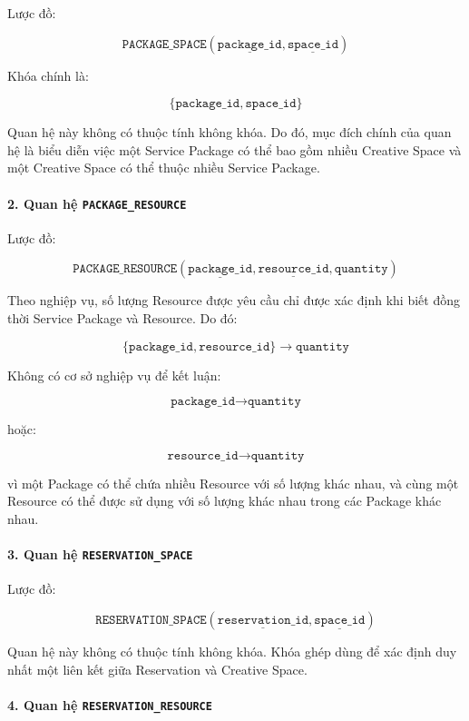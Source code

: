 Lược đồ:

$$
\texttt{PACKAGE\_SPACE}(
\underline{\texttt{package\_id}},
\underline{\texttt{space\_id}})
$$

Khóa chính là:

$$
\{
\texttt{package\_id},
\texttt{space\_id}
\}
$$

Quan hệ này không có thuộc tính không khóa. Do đó, mục đích chính của quan hệ là biểu diễn việc một Service Package có thể bao gồm nhiều Creative Space và một Creative Space có thể thuộc nhiều Service Package.

\paragraph{2. Quan hệ \texttt{PACKAGE\_RESOURCE}}\mbox{}\par

Lược đồ:

$$
\texttt{PACKAGE\_RESOURCE}(
\underline{\texttt{package\_id}},
\underline{\texttt{resource\_id}},
\texttt{quantity})
$$

Theo nghiệp vụ, số lượng Resource được yêu cầu chỉ được xác định khi biết đồng thời Service Package và Resource. Do đó:

$$
\{
\texttt{package\_id},
\texttt{resource\_id}
\}
\rightarrow
\texttt{quantity}
$$

Không có cơ sở nghiệp vụ để kết luận:

$$
\texttt{package\_id} \rightarrow \texttt{quantity}
$$

hoặc:

$$
\texttt{resource\_id} \rightarrow \texttt{quantity}
$$

vì một Package có thể chứa nhiều Resource với số lượng khác nhau, và cùng một Resource có thể được sử dụng với số lượng khác nhau trong các Package khác nhau.

\paragraph{3. Quan hệ \texttt{RESERVATION\_SPACE}}\mbox{}\par

Lược đồ:

$$
\texttt{RESERVATION\_SPACE}(
\underline{\texttt{reservation\_id}},
\underline{\texttt{space\_id}})
$$

Quan hệ này không có thuộc tính không khóa. Khóa ghép dùng để xác định duy nhất một liên kết giữa Reservation và Creative Space.

\paragraph{4. Quan hệ \texttt{RESERVATION\_RESOURCE}}\mbox{}\par

